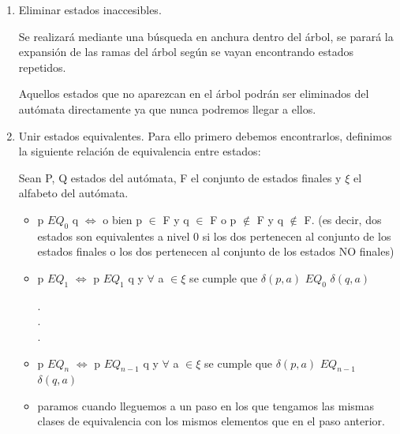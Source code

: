 \documentclass{apuntes}
\begin{document}
\begin{enumerate}
\item Eliminar estados inaccesibles. 

Se realizará mediante una búsqueda en anchura dentro del árbol, se parará la expansión de las ramas del árbol según se vayan encontrando estados repetidos. 

Aquellos estados que no aparezcan en el árbol podrán ser eliminados del autómata directamente ya que nunca podremos llegar a ellos.

\item Unir estados equivalentes. Para ello primero debemos encontrarlos, definimos la siguiente relación de equivalencia entre estados:

Sean P, Q estados del autómata, F el conjunto de estados finales y $\xi$ el alfabeto del autómata.

\begin{itemize}
\item p $EQ_0$ q  $\Longleftrightarrow$ o bien p $\in$ F y q $\in$ F o p $\notin$ F y q $\notin$ F. (es decir, dos estados son equivalentes a nivel 0 si los dos pertenecen al conjunto de los estados finales o los dos pertenecen al conjunto de los estados NO finales)

\item p $EQ_1$ $\Longleftrightarrow$ p $EQ_1$ q y $\forall$ a $\in \xi$ se cumple que $\delta(p,a)$ $EQ_0$ $\delta(q,a)$

.\\
.\\
.
\item p $EQ_n$ $\Longleftrightarrow$ p $EQ_{n-1}$ q y $\forall$ a $\in \xi$ se cumple que $\delta(p,a)$ $EQ_{n-1}$ $\delta(q,a)$
\item paramos cuando lleguemos a un paso en los que tengamos las mismas clases de equivalencia con los mismos elementos que en el paso anterior.

\end{itemize}
\end{enumerate}
\end{document}
